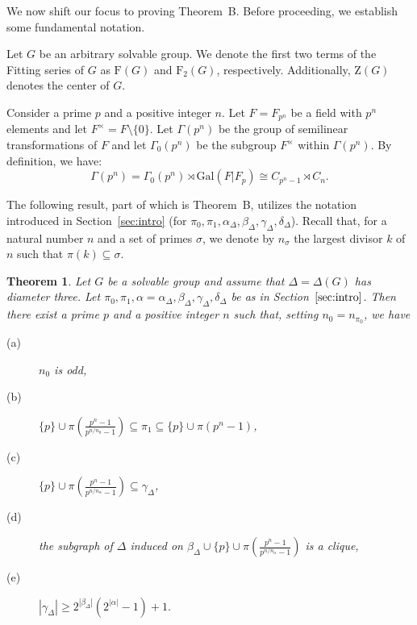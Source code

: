 \documentclass{amsart}
\newtheorem{theorem}{Theorem}[section]
\begin{document}
We now shift our focus to proving Theorem~B. Before proceeding, we establish some fundamental notation.

Let $G$ be an arbitrary solvable group. We denote the first two terms of the Fitting series of $G$ as $\mathrm{F}(G)$ and $\mathrm{F}_2(G)$, respectively. Additionally, $\mathrm{Z}(G)$ denotes the center of $G$.

Consider a prime $p$ and a positive integer $n$. Let $F = F_{p^n}$ be a field with $p^n$ elements and let $F^\times = F \setminus \{ 0 \}$.
Let $\Gamma(p^n)$
be the group of semilinear transformations of $F$  and let $\Gamma_0(p^n)$ be  the  subgroup $F^\times$ within $\Gamma(p^n)$.
 By definition, we have:
$$\Gamma(p^n)=\Gamma_0(p^n)\rtimes\mathrm{Gal}(F|F_p)\cong C_{p^n-1}\rtimes C_n.$$

The following result, part of which is Theorem~B, utilizes the notation introduced in Section~\ref{sec:intro} (for $\pi_0,\pi_1,\alpha_\Delta,\beta_\Delta,\gamma_\Delta,\delta_\Delta$). Recall that, for a natural number $n$ and a set of primes $\sigma$, we denote by $n_\sigma$ the largest divisor $k$ of $n$ such that $\pi(k) \subseteq \sigma$.

\begin{theorem}\label{primesets}
  Let $G$ be a solvable group  and assume that $\Delta=\Delta(G)$ has diameter three. Let $\pi_0,\pi_1,\alpha = \alpha_\Delta,\beta_\Delta,\gamma_\Delta,\delta_\Delta$ be as in Section~$\ref{sec:intro}$.
  Then there exist a prime $p$ and  a positive integer $n$  such that, setting  $n_0 = n_{\pi_0}$, we have
  \begin{description}
  \item[(a)] $n_0$ is odd,
  \item[(b)]  $\{ p \} \cup \pi\left(\frac{p^n -1}{p^{n/n_0}-1}\right) \subseteq \pi_1 \subseteq \{ p \} \cup \pi(p^n-1)$,
  \item[(c)]    $\{ p \} \cup \pi\left(\frac{p^n -1}{p^{n/n_{\alpha}}-1}\right) \subseteq \gamma_{\Delta}$,

\item[(d)] the subgraph of $\Delta$ induced on $\beta_{\Delta} \cup \{ p \} \cup \pi\left(\frac{p^n -1}{p^{n/n_{\alpha}}-1}\right)$
is a clique,
\item[(e)]$|\gamma_{\Delta}| \geq 2^{|\beta_{\Delta}|}\left( 2^{|\alpha|} -1  \right) + 1 .$
\end{description}
\end{theorem}
\end{document}
